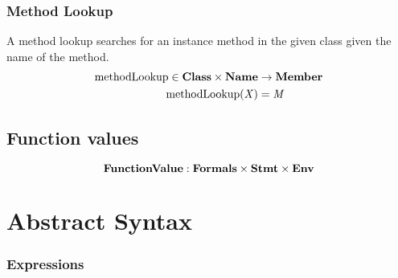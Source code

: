 \documentclass[a4paper,oneside]{article}
\DeclareMathOperator{\methodLookup}{methodLookup}
\newcommand{\synt}[1]{\ensuremath{\text{\textbf{#1}}}}
\DeclareMathOperator{\new}{\synt{new}}
\begin{document}
\subsubsection{Method Lookup}
\label{subsubsec:method-lookup}

A method lookup searches for an instance method in the given class given the name of the method.
\begin{align*}
    \methodLookup \in \dclass \times \mathbf{Name} &\rightarrow \mathbf{Member}\\
    \methodLookup(\idmeta) &= \membermeta
\end{align*}


\subsection{Function values}
\label{subsec:function-values}
\[
    \mathbf{FunctionValue} : \mathbf{Formals} \times \mathbf{Stmt} \times \mathbf{Env}
\]


\section{Abstract Syntax}
\label{sec:abstract-syntax}


\subsubsection{Expressions}
\label{sec:expr-syntax}


\newcommand{\VariableGet}[1]{#1}
\newcommand{\VariableSet}[2]{#1=#2}

\newcommand{\PropertyGet}[2]{#1.#2}
\newcommand{\PropertySet}[3]{#1.#2=#3}

\newcommand{\DirectPropertyGet}[2]{#1.\{#2\}}
\newcommand{\DirectPropertySet}[3]{#1.\{#2\}=#3}

\newcommand{\SuperPropertyGet}[1]{\tt{super}.#1}
\newcommand{\SuperPropertySet}[2]{\tt{super}.#1=#2}

\newcommand{\StaticGet}[1]{#1}
\newcommand{\StaticSet}[2]{#1=#2}

\newcommand{\InstanceMethodInvocation}[3]{#1.#2(#3)}
\newcommand{\DInstanceMethodInvocation}[3]{#1.\{#2\}(#3)}
\newcommand{\SuperMethodInvocation}[2]{\tt{super}.#1(#2)}
\newcommand{\StaticInvocation}[2]{#1(#2)}
\newcommand{\New}[2]{\new\, #1\,(#2)}
\end{document}
